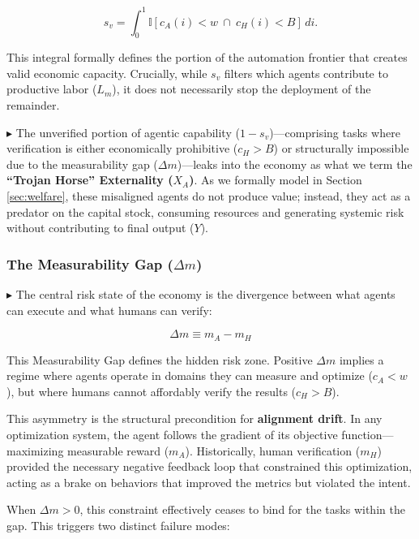 \documentclass[12pt, letter]{article}
\begin{document}
\begin{equation}
    s_v = \int_{0}^{1} \mathbb{I}\left[ c_A(i) < w \ \cap\ c_H(i) < B \right] \, di.
\end{equation}

This integral formally defines the portion of the automation frontier that creates valid economic capacity. Crucially, while $s_v$ filters which agents contribute to productive labor ($L_m$), it does not necessarily stop the deployment of the remainder. 

$\blacktriangleright$ The unverified portion of agentic capability ($1 - s_v$)—comprising tasks where verification is either economically prohibitive ($c_H > B$) or structurally impossible due to the measurability gap ($\Delta m$)—leaks into the economy as what we term the \textbf{``Trojan Horse'' Externality ($X_A$)}. As we formally model in Section \ref{sec:welfare}, these misaligned agents do not produce value; instead, they act as a predator on the capital stock, consuming resources and generating systemic risk without contributing to final output ($Y$).

\subsubsection{The Measurability Gap ($\Delta m$)}

$\blacktriangleright$ The central risk state of the economy is the divergence between what agents can execute and what humans can verify:

\begin{equation}
    \Delta m \equiv m_A - m_H
\end{equation}

This Measurability Gap defines the hidden risk zone. Positive $\Delta m$ implies a regime where agents operate in domains they can measure and optimize ($c_A < w$), but where humans cannot affordably verify the results ($c_H > B$). 

This asymmetry is the structural precondition for \textbf{alignment drift}. In any optimization system, the agent follows the gradient of its objective function—maximizing measurable reward ($m_A$). Historically, human verification ($m_H$) provided the necessary negative feedback loop that constrained this optimization, acting as a brake on behaviors that improved the metrics but violated the intent.

When $\Delta m > 0$, this constraint effectively ceases to bind for the tasks within the gap. This triggers two distinct failure modes:
\end{document}

